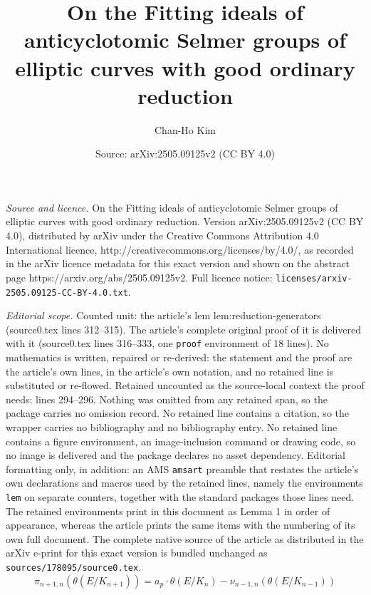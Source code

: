 \documentclass[10pt,a4paper]{amsart}
\title{On the Fitting ideals of anticyclotomic Selmer groups of elliptic curves with good ordinary reduction}
\author{Chan-Ho Kim}
\date{Source: arXiv:2505.09125v2 (CC BY 4.0)}
\begin{document}
\maketitle

\noindent\emph{Source and licence.} On the Fitting ideals of anticyclotomic Selmer groups of elliptic curves with good ordinary reduction. Version arXiv:2505.09125v2 (CC BY 4.0), distributed by arXiv under the Creative Commons Attribution 4.0 International licence, http://creativecommons.org/licenses/by/4.0/, as recorded in the arXiv licence metadata for this exact version and shown on the abstract page https://arxiv.org/abs/2505.09125v2. Full licence notice: \texttt{licenses/arxiv-2505.09125-CC-BY-4.0.txt}.\par\smallskip

\noindent\textit{Editorial scope.} Counted unit: the article's lem lem:reduction-generators (source0.tex lines 312--315). The article's complete original proof of it is delivered with it (source0.tex lines 316--333, one \texttt{proof} environment of 18 lines). No mathematics is written, repaired or re-derived: the statement and the proof are the article's own lines, in the article's own notation, and no retained line is substituted or re-flowed.  Retained uncounted as the source-local context the proof needs: lines 294--296.  Nothing was omitted from any retained span, so the package carries no omission record.  No retained line contains a citation, so the wrapper carries no bibliography and no bibliography entry.  No retained line contains a figure environment, an image-inclusion command or drawing code, so no image is delivered and the package declares no asset dependency.  Editorial formatting only, in addition: an AMS \texttt{amsart} preamble that restates the article's own declarations and macros used by the retained lines, namely the environments \texttt{lem} on separate counters, together with the standard packages those lines need.  The retained environments print in this document as Lemma 1 in order of appearance, whereas the article prints the same items with the numbering of its own full document.  The complete native source of the article as distributed in the arXiv e-print for this exact version is bundled unchanged as \texttt{sources/178095/source0.tex}.
\begin{equation} \label{eqn:three-term-relation}
\pi_{n+1, n} \left( \theta(E/K_{n+1}) \right) = a_p \cdot \theta(E/K_n) - \nu_{n-1, n} \left( \theta(E/K_{n-1}) \right)
\end{equation}
\end{document}
